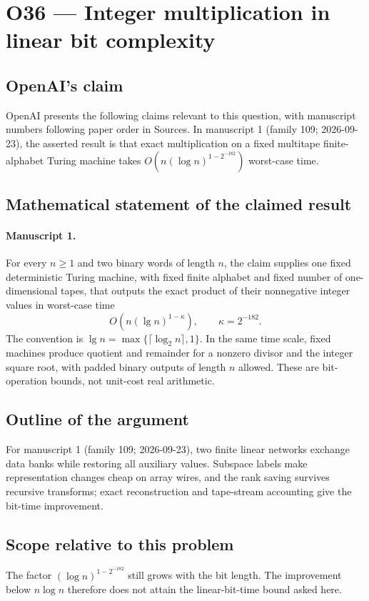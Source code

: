 \documentclass[11pt]{article}
\begin{document}
\section*{O36 — Integer multiplication in linear bit complexity}

\subsection{OpenAI's claim}
OpenAI presents the following claims relevant to this question, with manuscript numbers following paper order in Sources. In manuscript 1 (family 109; 2026-09-23), the asserted result is that exact multiplication on a fixed multitape finite-alphabet Turing machine takes $O(n(\log n)^{1-2^{-182}})$ worst-case time.

\subsection{Mathematical statement of the claimed result}
\paragraph{Manuscript 1.}
For every $n\ge1$ and two binary words of length $n$, the claim supplies one fixed deterministic Turing machine, with fixed finite alphabet and fixed number of one-dimensional tapes, that outputs the exact product of their nonnegative integer values in worst-case time
\[
 O(n(\lg n)^{1-\kappa}),\qquad\kappa=2^{-182}.
\]
The convention is $\lg n=\max\{\lceil\log_2n\rceil,1\}$. In the same time scale, fixed machines produce quotient and remainder for a nonzero divisor and the integer square root, with padded binary outputs of length $n$ allowed. These are bit-operation bounds, not unit-cost real arithmetic.

\subsection{Outline of the argument}
For manuscript 1 (family 109; 2026-09-23), two finite linear networks exchange data banks while restoring all auxiliary values. Subspace labels make representation changes cheap on array wires, and the rank saving survives recursive transforms; exact reconstruction and tape-stream accounting give the bit-time improvement.

\subsection{Scope relative to this problem}
The factor $(\log n)^{1-2^{-182}}$ still grows with the bit length. The improvement below $n\log n$ therefore does not attain the linear-bit-time bound asked here.
\end{document}
